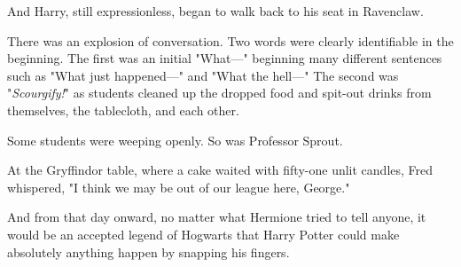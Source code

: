 And Harry, still expressionless, began to walk back to his seat in Ravenclaw.

There was an explosion of conversation. Two words were clearly identifiable in 
the beginning. The first was an initial "What---" beginning many different 
sentences such as "What just happened---" and "What the hell---" The second was 
"\emph{Scourgify!}" as students cleaned up the dropped food and spit-out drinks 
from themselves, the tablecloth, and each other.

Some students were weeping openly. So was Professor Sprout.

At the Gryffindor table, where a cake waited with fifty-one unlit candles, Fred 
whispered, "I think we may be out of our league here, George."

And from that day onward, no matter what Hermione tried to tell anyone, it 
would be an accepted legend of Hogwarts that Harry Potter could make absolutely 
anything happen by snapping his fingers.
